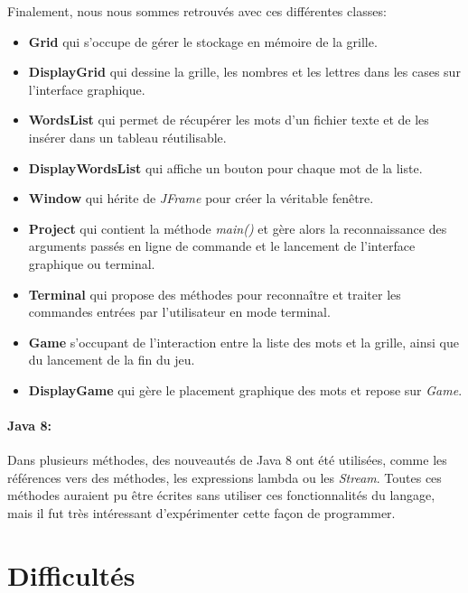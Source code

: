 \documentclass{article}
\begin{document}
Finalement, nous nous sommes retrouvés avec ces différentes classes:
\begin{itemize}
  \item \textbf{Grid} qui s'occupe de gérer le stockage en mémoire de la grille.
  \item \textbf{DisplayGrid} qui dessine la grille, les nombres et les lettres dans les cases sur l'interface graphique.
  \item \textbf{WordsList} qui permet de récupérer les mots d'un fichier texte et de les insérer dans un tableau réutilisable.
  \item \textbf{DisplayWordsList} qui affiche un bouton pour chaque mot de la liste.
  \item \textbf{Window} qui hérite de \textit{JFrame} pour créer la véritable fenêtre.
  \item \textbf{Project} qui contient la méthode \textit{main()} et gère alors la reconnaissance des arguments passés en ligne de commande et le lancement de l'interface graphique ou terminal.
  \item \textbf{Terminal} qui propose des méthodes pour reconnaître et traiter les commandes entrées par l'utilisateur en mode terminal.
  \item \textbf{Game} s'occupant de l'interaction entre la liste des mots et la grille, ainsi que du lancement de la fin du jeu.
  \item \textbf{DisplayGame} qui gère le placement graphique des mots et repose sur \textit{Game}.
\end{itemize}

\paragraph{Java 8:} Dans plusieurs méthodes, des nouveautés de Java 8 ont été utilisées, comme les références vers des méthodes, les expressions lambda ou les \textit{Stream}. Toutes ces méthodes auraient pu être écrites sans utiliser ces fonctionnalités du langage, mais il fut très intéressant d'expérimenter cette façon de programmer.


\section{Difficultés}
\end{document}
